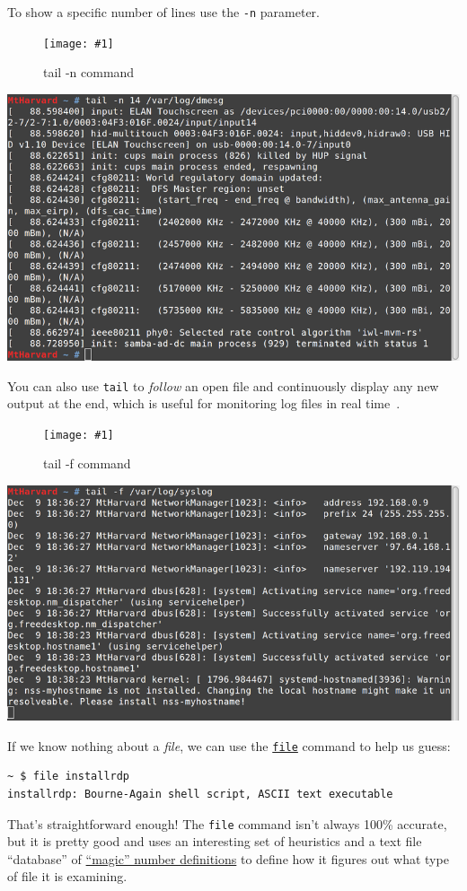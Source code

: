 \documentclass[10pt,]{book}
\numberwithin{figure}{chapter}
\DeclareRobustCommand{\fimg}[3]{
\ifxetex
\begin{figure}[H]
\texttt{[image: \#1]}
\caption{#2}
\label{fig:#3}
\end{figure}
\fi}
\DeclareRobustCommand{\fref}[1]{\ifxetex{(Figure \ref{fig:#1})}\fi}
\begin{document}
To show a specific number of lines \fref{tail-n-dmesg} use the
\texttt{-n} parameter.

\ifxetex\fimg{./images/tail-n-dmesg.png}{tail -n command}{tail-n-dmesg}
\else
\includegraphics{./images/tail-n-dmesg.png} \fi

You can also use \texttt{tail} to \emph{follow} an open file and
continuously display any new output at the end, which is useful for
monitoring log files in real time~\fref{tail-f}.

\ifxetex\fimg{./images/tail-f.png}{tail -f command}{tail-f} \else
\includegraphics{./images/tail-f.png} \fi

If we know nothing about a \emph{file}, we can use the
\href{http://linux.die.net/man/1/file}{\texttt{file}} command to help us
guess:

\begin{verbatim}
~ $ file installrdp 
installrdp: Bourne-Again shell script, ASCII text executable
\end{verbatim}

That's straightforward enough! The \texttt{file} command isn't always
100\% accurate, but it is pretty good and uses an interesting set of
heuristics and a text file ``database'' of
\href{http://linux.die.net/man/5/magic}{``magic'' number definitions} to
define how it figures out what type of file it is examining.
\end{document}
